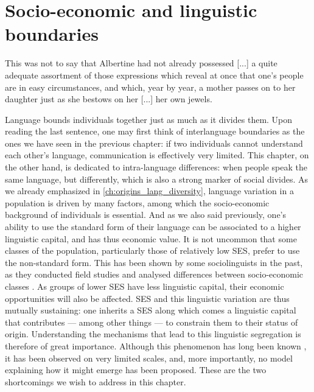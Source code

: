 \documentclass[../thesis.tex]{subfiles}
\begin{document}
\chapter{Socio-economic and linguistic boundaries}
\label{ch:ses_ling}

\epigraph{
  This was not to say that Albertine had not already possessed [...] a quite
  adequate assortment  of those expressions which reveal at once that one's people are
  in easy circumstances, and which, year by year, a mother passes on to her daughter
  just as she bestows on her [...]
  her own jewels.
}{
}

Language bounds individuals together just as much as it divides them. Upon reading the
last sentence, one may first think of interlanguage boundaries as the ones we have seen
in the previous chapter: if two individuals cannot understand each other's language,
communication is effectively very limited. This chapter, on the other hand, is dedicated
to intra-language differences: when people speak the same language, but differently,
which is also a strong marker of social divides. As we already emphasized in
\cref{ch:origins_lang_diversity}, language variation in a population is driven by many
factors, among which the socio-economic background of individuals is essential. And as
we also said previously, one's ability to use the standard form of their language can be
associated to a higher linguistic capital, and has thus economic value. It is not
uncommon that some classes of the population, particularly those of relatively low
\ac{SES}, prefer to use the non-standard form. This has been shown by some
sociolinguists in the past, as they conducted field studies and analysed differences
between socio-economic classes
\cite{LabovSocialStratification1966,TrudgillSocialDifferentiation1974}. As groups of
lower \ac{SES} have less linguistic capital, their economic opportunities will also be
affected. \Ac{SES} and this linguistic variation are thus mutually sustaining: one
inherits a \ac{SES} along which comes a linguistic capital that contributes --- among
other things --- to constrain them to their status of origin. Understanding the
mechanisms that lead to this linguistic segregation is therefore of great importance.
Although this phenomenon has long been known \cite{ChambersSociolinguisticTheory2007},
it has been observed on very limited scales, and, more importantly, no model explaining
how it might emerge has been proposed. These are the two shortcomings we wish to address
in this chapter. 
\end{document}
